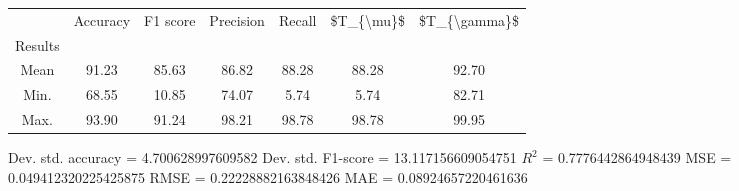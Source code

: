 \begin{tabular}{|c|c|c|c|c|c|c|}
\toprule
{} &  Accuracy &  F1 score &  Precision &  Recall &  \$T\_\{\textbackslash mu\}\$ &  \$T\_\{\textbackslash gamma\}\$ \\
Results &           &           &            &         &            &               \\
\hline
Mean    &     91.23 &     85.63 &      86.82 &   88.28 &      88.28 &         92.70 \\
Min.    &     68.55 &     10.85 &      74.07 &    5.74 &       5.74 &         82.71 \\
Max.    &     93.90 &     91.24 &      98.21 &   98.78 &      98.78 &         99.95 \\
\bottomrule
\end{tabular}

 Dev. std. accuracy = 4.700628997609582
 Dev. std. F1-score = 13.117156609054751
 $R^2$ = 0.7776442864948439
 MSE = 0.049412320225425875
 RMSE = 0.22228882163848426
 MAE = 0.08924657220461636